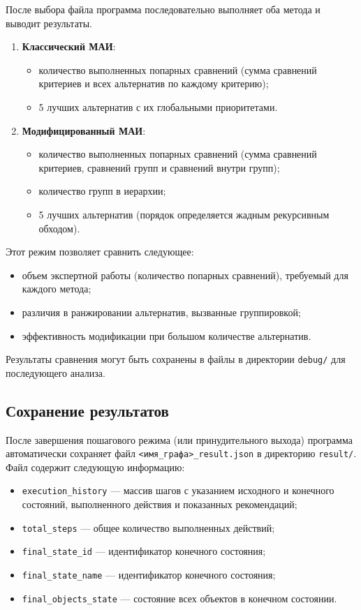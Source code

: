 После выбора файла программа последовательно выполняет оба метода и выводит результаты.

\begin{enumerate}
\item \textbf{Классический МАИ}:
\begin{itemize}
\item количество выполненных попарных сравнений (сумма сравнений критериев и всех альтернатив по каждому критерию);
\item 5 лучших альтернатив с их глобальными приоритетами.
\end{itemize}
\item \textbf{Модифицированный МАИ}:
\begin{itemize}
\item количество выполненных попарных сравнений (сумма сравнений критериев, сравнений групп и сравнений внутри групп);
\item количество групп в иерархии;
\item 5 лучших альтернатив (порядок определяется жадным рекурсивным обходом).
\end{itemize}
\end{enumerate}

Этот режим позволяет сравнить следующее:
\begin{itemize}
\item объем экспертной работы (количество попарных сравнений), требуемый для каждого метода;
\item различия в ранжировании альтернатив, вызванные группировкой;
\item эффективность модификации при большом количестве альтернатив.
\end{itemize}

Результаты сравнения могут быть сохранены в файлы в директории \texttt{debug/} для последующего анализа.

\subsection*{Сохранение результатов}

После завершения пошагового режима (или принудительного выхода) программа автоматически сохраняет файл \texttt{<имя\_графа>\_result.json} в директорию \texttt{result/}. 
Файл содержит следующую информацию:
\begin{itemize}
\item \texttt{execution\_history} --- массив шагов с указанием исходного и конечного состояний, выполненного действия и показанных рекомендаций;
\item \texttt{total\_steps} --- общее количество выполненных действий;
\item \texttt{final\_state\_id} --- идентификатор конечного состояния;
\item \texttt{final\_state\_name} --- идентификатор конечного состояния;
\item \texttt{final\_objects\_state} --- состояние всех объектов в конечном состоянии.
\end{itemize}

